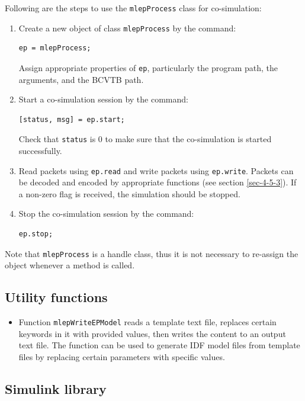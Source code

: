 \documentclass[11pt,letter]{article}
\begin{document}
Following are the steps to use the \verb+mlepProcess+ class
for co-simulation:
\begin{enumerate}
\item Create a new object of class \verb+mlepProcess+ by the
command:
\begin{verbatim}
ep = mlepProcess;
\end{verbatim}
Assign appropriate properties of \verb+ep+, particularly the program
path, the arguments, and the BCVTB path.
\item Start a co-simulation session by the command:
\begin{verbatim}
[status, msg] = ep.start;
\end{verbatim}
Check that \verb+status+ is 0 to make sure that the co-simulation is
started successfully.
\item Read packets using \verb+ep.read+ and write packets using \verb+ep.write+.
Packets can be decoded and encoded by appropriate functions (see
section \ref{sec-4-5-3}).  If a non-zero flag is
received, the simulation should be stopped.
\item Stop the co-simulation session by the command:
\begin{verbatim}
ep.stop;
\end{verbatim}
\end{enumerate}


Note that \verb+mlepProcess+ is a handle class, thus it is
not necessary to re-assign the object whenever a method is called.


\subsection{Utility functions}
\label{sec-4-6}

\begin{itemize}
\item Function \verb+mlepWriteEPModel+ reads a template text
file, replaces certain keywords in it with provided values, then
writes the content to an output text file.  The function can be used
to generate IDF model files from template files by replacing certain
parameters with specific values.
\end{itemize}

\subsection{Simulink library}
\label{sec-4-7}
\end{document}
